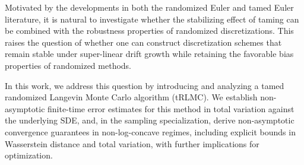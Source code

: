 \documentclass[11pt,a4paper,reqno]{amsart}
\theoremstyle{plain}
\theoremstyle{definition}
\theoremstyle{remark}
\begin{document}
Motivated by the developments in both the randomized Euler and tamed Euler literature, it is natural to investigate whether the stabilizing effect of taming can be combined with the robustness properties of randomized discretizations. This raises the question of whether one can construct discretization schemes that remain stable under super-linear drift growth while retaining the favorable bias properties of randomized methods.

In this work, we address this question by introducing and analyzing a tamed randomized Langevin Monte Carlo algorithm (tRLMC). We establish non-asymptotic finite-time error estimates for this method in total variation against the underlying SDE, and, in the sampling specialization, derive non-asymptotic convergence guarantees in non-log-concave regimes, including explicit bounds in Wasserstein distance and total variation, with further implications for optimization.
\end{document}

